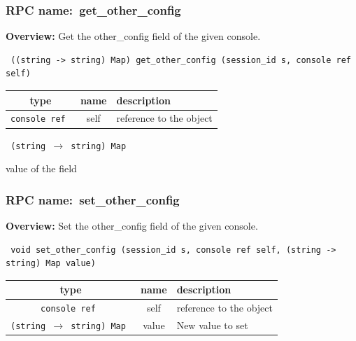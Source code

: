 \subsubsection{RPC name:~get\_other\_config}

{\bf Overview:} 
Get the other\_config field of the given console.

\begin{verbatim} ((string -> string) Map) get_other_config (session_id s, console ref self)\end{verbatim}



 
\vspace{0.3cm}
\begin{tabular}{|c|c|p{7cm}|}
 \hline
{\bf type} & {\bf name} & {\bf description} \\ \hline
{\tt console ref } & self & reference to the object \\ \hline 

\end{tabular}

\vspace{0.3cm}

{\tt 
(string $\rightarrow$ string) Map
}


value of the field
\vspace{0.3cm}
\vspace{0.3cm}
\vspace{0.3cm}
\subsubsection{RPC name:~set\_other\_config}

{\bf Overview:} 
Set the other\_config field of the given console.

\begin{verbatim} void set_other_config (session_id s, console ref self, (string -> string) Map value)\end{verbatim}



 
\vspace{0.3cm}
\begin{tabular}{|c|c|p{7cm}|}
 \hline
{\bf type} & {\bf name} & {\bf description} \\ \hline
{\tt console ref } & self & reference to the object \\ \hline 

{\tt (string $\rightarrow$ string) Map } & value & New value to set \\ \hline 

\end{tabular}

